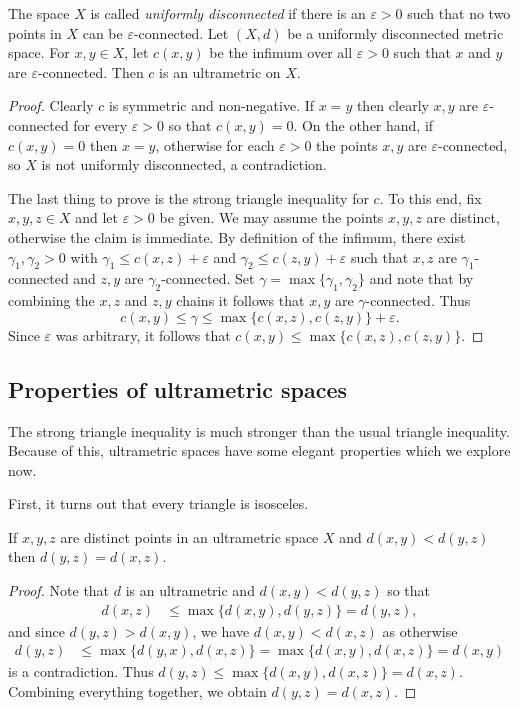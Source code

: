 The space \( X \) is called \emph{uniformly disconnected} if there is an \( \varepsilon > 0 \) such that no two points in \( X \) can be \( \varepsilon  \)-connected.
Let \( (X,d) \) be a uniformly disconnected metric space. For \( x,y \in X \), let \( c(x,y) \) be the infimum over all \( \varepsilon > 0 \) such that \( x \) and \( y \) are \( \varepsilon  \)-connected. Then \( c \) is an ultrametric on \( X \).
\begin{proof}
Clearly \( c \) is symmetric and non-negative. If \( x = y \) then clearly \( x,y \) are \( \varepsilon  \)-connected for every \( \varepsilon > 0 \) so that \( c(x,y) = 0 \). On the other hand, if \( c(x,y) = 0  \) then \( x = y \), otherwise for each \( \varepsilon > 0 \) the points \( x,y \) are \( \varepsilon  \)-connected, so \( X \) is not uniformly disconnected, a contradiction.

The last thing to prove is the strong triangle inequality for \( c \). To this end, fix \( x,y,z \in X \) and let \( \varepsilon > 0 \) be given. We may assume the points \( x,y,z \) are distinct, otherwise the claim is immediate. By definition of the infimum, there exist \( \gamma_1, \gamma_2 > 0 \) with \( \gamma_1 \leq c(x,z) + \varepsilon  \) and \( \gamma_2 \leq c(z,y) + \varepsilon  \) such that \( x,z \) are \( \gamma_1 \)-connected and \( z,y \) are \( \gamma_2 \)-connected. Set \( \gamma = \max \{ \gamma_1, \gamma_2 \}\) and note that by combining the \( x,z \) and \( z,y \) chains it follows that \( x,y \) are \( \gamma \)-connected. Thus \[ c(x,y) \leq \gamma \leq \max \{ c(x,z), c(z,y) \} + \varepsilon . \] Since \( \varepsilon  \) was arbitrary, it follows that \( c(x,y) \leq \max \{ c(x,z), c(z,y) \} \).
\end{proof}
\subsection{Properties of ultrametric spaces} The strong triangle inequality is much stronger than the usual triangle inequality. Because of this, ultrametric spaces have some elegant properties which we explore now.

First, it turns out that every triangle is isosceles.
\begin{lemma}
If \( x, y, z \) are distinct points in an ultrametric space \( X \) and \( d(x,y) < d(y,z) \) then \( d(y,z) = d(x,z) \).
\end{lemma}
\begin{proof}
Note that \( d \) is an ultrametric and \( d(x,y) < d(y,z) \) so that
\begin{align*}
	d(x, z) &\leq \max \{ d(x,y), d(y, z) \} = d(y,z),
\end{align*}
and since \( d(y,z) > d(x,y) \), we have \( d(x,y) < d(x,z) \) as otherwise
\begin{align*}
	d(y,z) &\leq \max \{ d(y, x) , d(x, z) \} = \max \{ d(x,y) , d(x,z) \} = d(x,y)
\end{align*}
is a contradiction. Thus \( d(y,z) \leq \max \{ d(x,y), d(x,z) \} = d(x,z) \). Combining everything together, we obtain \( d(y,z) = d(x,z) \).
\end{proof}

